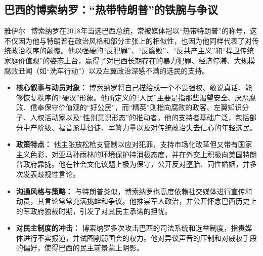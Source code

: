 \documentclass[UTF8, 10pt]{ctexbook}
\begin{document}
\subsection{巴西的博索纳罗：“热带特朗普”的铁腕与争议}
雅伊尔·博索纳罗在2018年当选巴西总统，常被媒体冠以“热带特朗普”的称号，这不仅因为他与特朗普在政治风格和部分主张上的相似性，也因为他同样代表了对传统政治秩序的颠覆。他以强硬的“反犯罪”、“反腐败”、“反共产主义”和“捍卫传统家庭价值观”的姿态上台，赢得了对巴西长期存在的暴力犯罪、经济停滞、大规模腐败丑闻（如“洗车行动”）以及左翼政治深感不满的选民的支持。
\begin{itemize}
    \item \textbf{核心叙事与动员对象：} 博索纳罗将自己描绘成一个不畏强权、敢说真话、能够恢复秩序的“硬汉”形象。他所定义的“人民”主要是指那些渴望安全、厌恶腐败、信奉保守价值观的“好公民”，而“精英”则指向腐败的政客、左翼知识分子、人权活动家以及“性别意识形态”的推动者。他的支持者基础广泛，包括部分中产阶级、福音派基督徒、军警力量以及对传统政治失去信心的年轻选民。
    \item \textbf{政策特点：} 他主张放松枪支管制以应对犯罪，支持市场化改革但又带有国家主义色彩，对亚马孙雨林的环境保护持消极态度，并在外交上积极向美国特朗普政府靠拢。他在社会文化议题上极为保守，公开反对堕胎、同性婚姻，并多次发表歧视性言论。
    \item \textbf{沟通风格与策略：} 与特朗普类似，博索纳罗也高度依赖社交媒体进行宣传和动员，其言论常常充满挑衅和争议。他推崇军人政治，并公开怀念巴西历史上的军政府独裁时期，引发了对其民主承诺的担忧。
    \item \textbf{对民主制度的冲击：} 博索纳罗多次攻击巴西的司法系统和选举制度，指责媒体进行不实报道，并试图削弱国会的权力。他对异议声音的压制和对威权手段的偏好，使得巴西的民主前景蒙上阴影。
\end{itemize}
\end{document}
